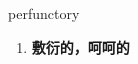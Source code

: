 
\begin{frame}
{\huge perfunctory}
\begin{center}
\begin{enumerate}\Large
  \item \textbf{敷衍的，呵呵的}
\end{enumerate}
\end{center}
\end{frame}
